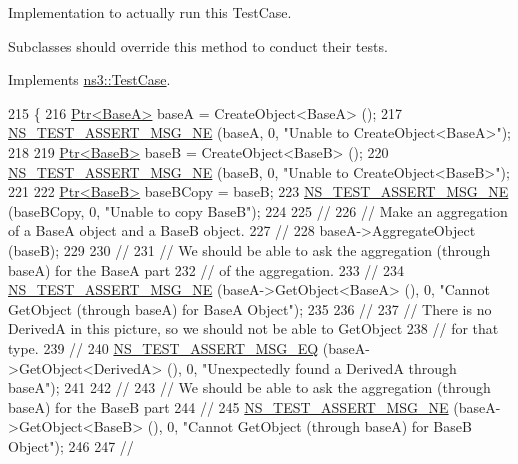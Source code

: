 Implementation to actually run this Test\+Case. 

Subclasses should override this method to conduct their tests. 

Implements \hyperlink{classns3_1_1TestCase_a8ff74680cf017ed42011e4be51917a24}{ns3\+::\+Test\+Case}.


\begin{DoxyCode}
215 \{
216   \hyperlink{classns3_1_1Ptr}{Ptr<BaseA>} baseA = CreateObject<BaseA> ();
217   \hyperlink{group__testing_ga73d66fb0050a5111453fd144e767b91a}{NS\_TEST\_ASSERT\_MSG\_NE} (baseA, 0, \textcolor{stringliteral}{"Unable to CreateObject<BaseA>"});
218 
219   \hyperlink{classns3_1_1Ptr}{Ptr<BaseB>} baseB = CreateObject<BaseB> ();
220   \hyperlink{group__testing_ga73d66fb0050a5111453fd144e767b91a}{NS\_TEST\_ASSERT\_MSG\_NE} (baseB, 0, \textcolor{stringliteral}{"Unable to CreateObject<BaseB>"});
221 
222   \hyperlink{classns3_1_1Ptr}{Ptr<BaseB>} baseBCopy = baseB;
223   \hyperlink{group__testing_ga73d66fb0050a5111453fd144e767b91a}{NS\_TEST\_ASSERT\_MSG\_NE} (baseBCopy, 0, \textcolor{stringliteral}{"Unable to copy BaseB"});
224 
225   \textcolor{comment}{//}
226   \textcolor{comment}{// Make an aggregation of a BaseA object and a BaseB object.}
227   \textcolor{comment}{//}
228   baseA->AggregateObject (baseB);
229 
230   \textcolor{comment}{//}
231   \textcolor{comment}{// We should be able to ask the aggregation (through baseA) for the BaseA part}
232   \textcolor{comment}{// of the aggregation.}
233   \textcolor{comment}{//}
234   \hyperlink{group__testing_ga73d66fb0050a5111453fd144e767b91a}{NS\_TEST\_ASSERT\_MSG\_NE} (baseA->GetObject<BaseA> (), 0, \textcolor{stringliteral}{"Cannot GetObject (through
       baseA) for BaseA Object"});
235 
236   \textcolor{comment}{//}
237   \textcolor{comment}{// There is no DerivedA in this picture, so we should not be able to GetObject}
238   \textcolor{comment}{// for that type.}
239   \textcolor{comment}{//}
240   \hyperlink{group__testing_ga2a9d78cffb3db8e867c35fff0b698cf5}{NS\_TEST\_ASSERT\_MSG\_EQ} (baseA->GetObject<DerivedA> (), 0, \textcolor{stringliteral}{"Unexpectedly found a
       DerivedA through baseA"});
241 
242   \textcolor{comment}{//}
243   \textcolor{comment}{// We should be able to ask the aggregation (through baseA) for the BaseB part}
244   \textcolor{comment}{//}
245   \hyperlink{group__testing_ga73d66fb0050a5111453fd144e767b91a}{NS\_TEST\_ASSERT\_MSG\_NE} (baseA->GetObject<BaseB> (), 0, \textcolor{stringliteral}{"Cannot GetObject (through
       baseA) for BaseB Object"});
246 
247   \textcolor{comment}{//}

\end{DoxyCode}
